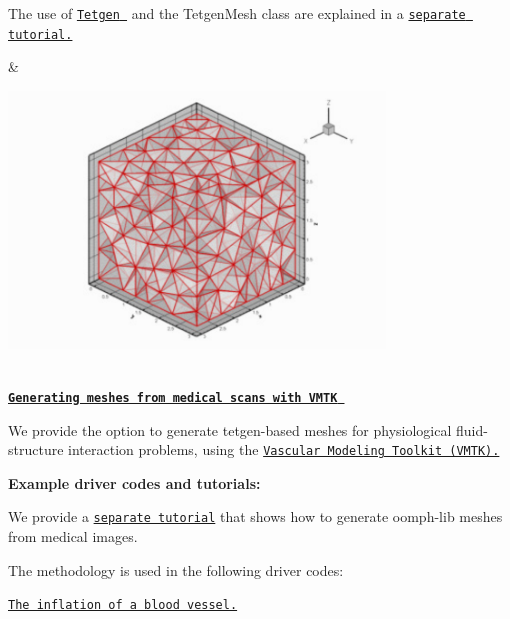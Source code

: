 \begin{center}
\begin{longtabu}
\begin{DoxyItemize}
\item The use of \href{http://wias-berlin.de/software/tetgen//}{\tt {\ttfamily Tetgen} } and the {\ttfamily Tetgen\+Mesh} class are explained in a \href{../../mesh_from_tetgen/html/index.html}{\tt separate tutorial.}
\end{DoxyItemize}& 
\begin{DoxyImageNoCaption}
  \mbox{\includegraphics[width=0.75\textwidth]{tetgen_mesh}}
\end{DoxyImageNoCaption}
   \\
\href{../../mesh_from_vmtk/html/index.html}{\tt {\bfseries  Generating meshes from medical scans with V\+M\+TK }} ~\newline
~\newline

\begin{DoxyItemize}
\item We provide the option to generate tetgen-\/based meshes for physiological fluid-\/structure interaction problems, using the \href{http://www.vmtk.org}{\tt Vascular Modeling Toolkit (V\+M\+TK).}
\end{DoxyItemize}{\bfseries Example driver codes and tutorials\+:} ~\newline

\begin{DoxyItemize}
\item We provide a \href{../../mesh_from_vmtk/html/index.html}{\tt separate tutorial} that shows how to generate {\ttfamily oomph-\/lib} meshes from medical images.
\item The methodology is used in the following driver codes\+: ~\newline
~\newline

\begin{DoxyItemize}
\item \href{../../../solid/vmtk_solid/html/index.html}{\tt The inflation of a blood vessel.} ~\newline
~\newline


\end{DoxyItemize}
\end{DoxyItemize}
\end{longtabu}
\end{center}
